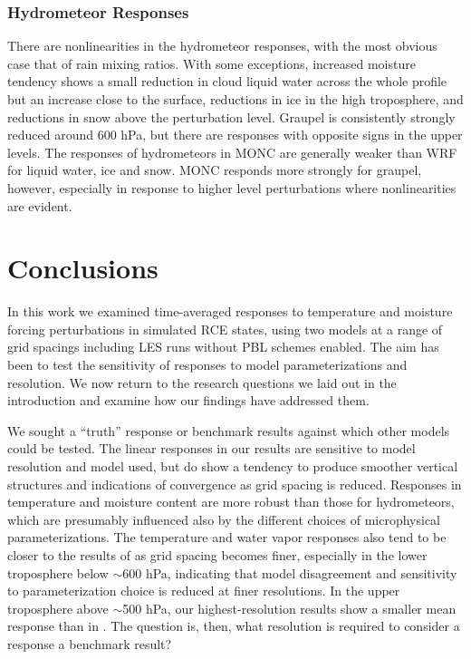 \documentclass[draft]{agujournal2019}
\begin{document}
\subsubsection{Hydrometeor Responses}

There are nonlinearities in the hydrometeor responses, with the most obvious
case that of rain mixing ratios. With some exceptions, increased moisture
tendency shows a small reduction in cloud liquid water across the whole profile
but an increase close to the surface, reductions in ice in the high troposphere,
and reductions in snow above the perturbation level. Graupel is consistently
strongly reduced around 600 hPa, but there are responses with opposite signs in
the upper levels. The responses of hydrometeors in MONC are generally weaker
than WRF for liquid water, ice and snow. MONC responds more strongly for
graupel, however, especially in response to higher level perturbations where
nonlinearities are evident.

\section{Conclusions}
\label{sec:conclusions}

In this work we examined time-averaged responses to temperature and moisture
forcing perturbations in simulated RCE states, using two models at a range of
grid spacings including LES runs without PBL schemes enabled. The aim has been
to test the sensitivity of responses to model parameterizations and resolution.
We now return to the research questions we laid out in the introduction and
examine how our findings have addressed them.

We sought a ``truth'' response or benchmark results against which other models
could be tested. The linear responses in our results are sensitive to model
resolution and model used, but do show a tendency to produce smoother vertical
structures and indications of convergence as grid spacing is reduced. Responses
in temperature and moisture content are more robust than those for hydrometeors,
which are presumably influenced also by the different choices of microphysical
parameterizations. The temperature and water vapor responses also tend to be
closer to the results of  as grid spacing becomes finer,
especially in the lower troposphere below $\sim$600 hPa, indicating that model
disagreement and sensitivity to parameterization choice is reduced at finer
resolutions. In the upper troposphere above $\sim$500 hPa, our
highest-resolution results show a smaller mean response than in
. The question is, then, what resolution is required to
consider a response a benchmark result?
\end{document}
